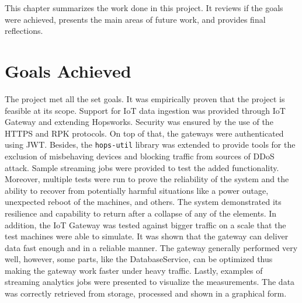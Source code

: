 This chapter summarizes the work done in this project. 
It reviews if the goals were achieved, presents the main areas of future work, and provides final reflections.
\section{Goals Achieved}
    The project met all the set goals.
    It was empirically proven that the project is feasible at its scope.
    Support for IoT data ingestion was provided through IoT Gateway and extending Hopsworks. Security was ensured by the use of the \ac{HTTPS} and \ac{RPK} protocols. 
    On top of that, the gateways were authenticated using \ac{JWT}.
    Besides, the \texttt{hops-util} library was extended to provide tools for the exclusion of misbehaving devices and blocking traffic from sources of \ac{DDoS} attack.
     Sample streaming jobs were provided to test the added functionality.
     Moreover, multiple tests were run to prove the reliability of the system and the ability to recover from potentially harmful situations like a power outage, unexpected reboot of the machines, and others. 
     The system demonstrated its resilience and capability to return after a collapse of any of the elements.
     In addition, the IoT Gateway was tested against bigger traffic on a scale that the test machines were able to simulate.
     It was shown that the gateway can deliver data fast enough and in a reliable manner.
     The gateway generally performed very well, however, some parts, like the DatabaseService, can be optimized thus making the gateway work faster under heavy traffic.
     Lastly, examples of streaming analytics jobs were presented to visualize the measurements.
     The data was correctly retrieved from storage, processed and shown in a graphical form.
